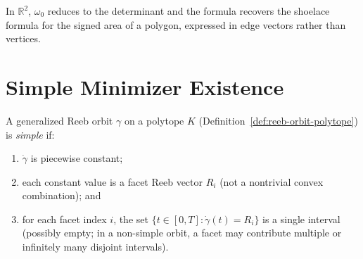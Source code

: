\begin{remark}\label{rem:shoelace-name}
In $\mathbb{R}^2$, $\omega_0$ reduces to the determinant and
the formula recovers the shoelace formula for the signed area of a
polygon, expressed in edge vectors rather than vertices.
\end{remark}


\section{Simple Minimizer Existence}\label{sec:simple-minimizer}

\begin{definition}\label{def:simple-reeb-orbit}
A generalized Reeb orbit $\gamma$ on a polytope $K$
(Definition~\ref{def:reeb-orbit-polytope}) is \emph{simple} if:
\begin{enumerate}
\item $\dot{\gamma}$ is piecewise constant;
\item each constant value is a facet Reeb vector $R_i$
  (not a nontrivial convex combination); and
\item for each facet index $i$, the set
  $\{ t \in [0, T] : \dot{\gamma}(t) = R_i \}$
  is a single interval (possibly empty; in a non-simple orbit,
  a facet may contribute multiple or infinitely many disjoint intervals).
\end{enumerate}
\end{definition}

